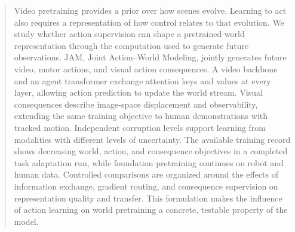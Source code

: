 \begin{abstract}
Video pretraining provides a prior over how scenes evolve. Learning to act also requires a
representation of how control relates to that evolution. We study whether action supervision can
shape a pretrained world representation through the computation used to generate future
observations. JAM, Joint Action--World Modeling, jointly generates future video, motor actions, and
visual action consequences. A video backbone and an agent transformer exchange attention keys and
values at every layer, allowing action prediction to update the world stream. Visual consequences
describe image-space displacement and observability, extending the same training objective to human
demonstrations with tracked motion. Independent corruption levels support learning from modalities
with different levels of uncertainty. The available training record shows decreasing world, action,
and consequence objectives in a completed task adaptation run, while foundation pretraining
continues on robot and human data. Controlled comparisons are organized around the effects of
information exchange, gradient routing, and consequence supervision on representation quality and
transfer. This formulation makes the influence of action learning on world pretraining a concrete,
testable property of the model.
\end{abstract}
